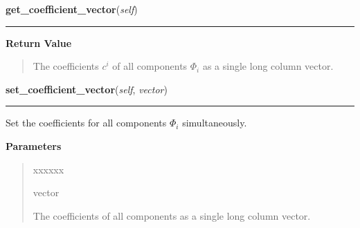 \hspace{.8\funcindent}\begin{boxedminipage}{\funcwidth}

    \raggedright \textbf{get\_coefficient\_vector}(\textit{self})

    \vspace{-1.5ex}

    \rule{\textwidth}{0.5\fboxrule}
\setlength{\parskip}{2ex}
\setlength{\parskip}{1ex}
      \textbf{Return Value}
    \vspace{-1ex}

      \begin{quote}
      The coefficients $c^i$ of all components
      $\Phi_i$ as a single long column vector.

      \end{quote}

    \end{boxedminipage}

    \label{HagedornMultiWavepacket:HagedornMultiWavepacket:set_coefficient_vector}

    \vspace{0.5ex}

\hspace{.8\funcindent}\begin{boxedminipage}{\funcwidth}

    \raggedright \textbf{set\_coefficient\_vector}(\textit{self}, \textit{vector})

    \vspace{-1.5ex}

    \rule{\textwidth}{0.5\fboxrule}
\setlength{\parskip}{2ex}
    Set the coefficients for all components $\Phi_i$
    simultaneously.

\setlength{\parskip}{1ex}
      \textbf{Parameters}
      \vspace{-1ex}

      \begin{quote}
        \begin{Ventry}{xxxxxx}

          \item[vector]

          The coefficients of all components as a single long column
          vector.

        \end{Ventry}

      \end{quote}

    \end{boxedminipage}

